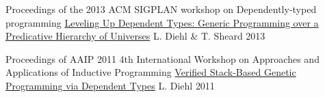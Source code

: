 \begin{cventries}
  \cventry
    {Proceedings of the 2013 ACM SIGPLAN workshop on Dependently-typed programming} %
    {\href{https://github.com/larrytheliquid/leveling-up}{Leveling Up Dependent Types: {\tiny Generic Programming over a Predicative Hierarchy of Universes}}} %
    {L. Diehl \& T. Sheard} %
    {2013} %
    {}

  \cventry
    {Proceedings of AAIP 2011 4th International Workshop on Approaches and Applications of Inductive Programming} %
    {\href{https://github.com/larrytheliquid/aaip11}{Verified Stack-Based Genetic Programming via Dependent Types}} %
    {L. Diehl} %
    {2011} %
    {}

\end{cventries}
